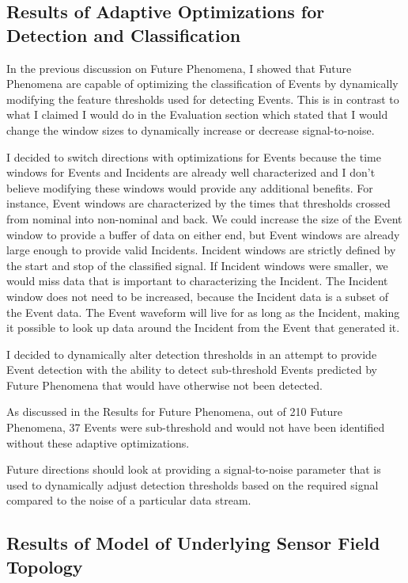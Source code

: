 \subsection{Results of Adaptive Optimizations for Detection and Classification}\label{subsec:results-of-adaptive-optimizations-for-detection-and-classification}

In the previous discussion on Future Phenomena, I showed that Future Phenomena are capable of optimizing the classification of Events by dynamically modifying the feature thresholds used for detecting Events. This is in contrast to what I claimed I would do in the Evaluation section which stated that I would change the window sizes to dynamically increase or decrease signal-to-noise.

I decided to switch directions with optimizations for Events because the time windows for Events and Incidents are already well characterized and I don't believe modifying these windows would provide any additional benefits. For instance, Event windows are characterized by the times that thresholds crossed from nominal into non-nominal and back. We could increase the size of the Event window to provide a buffer of data on either end, but Event windows are already large enough to provide valid Incidents. Incident windows are strictly defined by the start and stop of the classified signal. If Incident windows were smaller, we would miss data that is important to characterizing the Incident. The Incident window does not need to be increased, because the Incident data is a subset of the Event data. The Event waveform will live for as long as the Incident, making it possible to look up data around the Incident from the Event that generated it.

I decided to dynamically alter detection thresholds in an attempt to provide Event detection with the ability to detect sub-threshold Events predicted by Future Phenomena that would have otherwise not been detected.

As discussed in the Results for Future Phenomena, out of 210 Future Phenomena, 37 Events were sub-threshold and would not have been identified without these adaptive optimizations.

Future directions should look at providing a signal-to-noise parameter that is used to dynamically adjust detection thresholds based on the required signal compared to the noise of a particular data stream.

\subsection{Results of Model of Underlying Sensor Field Topology}\label{subsec:results-of-model-of-underlying-sensor-field-topology}

